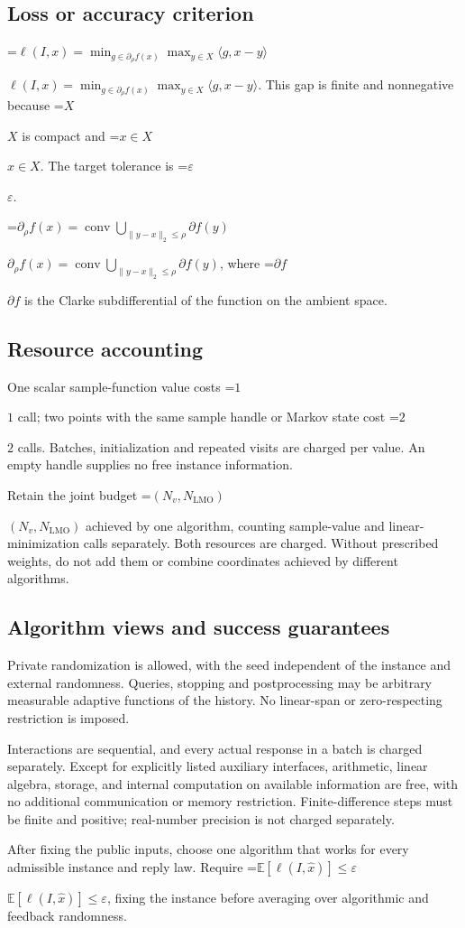 \documentclass[10pt,a4paper]{article}
\newcommand{\AtlasMath}[1]{\par\begingroup\centering\setbox0=\hbox{$\displaystyle #1$}\ifdim\wd0>1.4\linewidth\typeout{ATLAS WIDE FORMULA: \the\wd0}\fi\ifdim\wd0>\linewidth\resizebox{\linewidth}{!}{\box0}\else\box0\fi\par\endgroup}
\newcommand{\AtlasInlineMath}[1]{\begingroup\setbox0=\hbox{$#1$}\ifdim\wd0>.4\linewidth\endgroup\AtlasMath{#1}\else\endgroup$#1$\fi}
\begin{document}
\subsection{Loss or accuracy criterion}
\AtlasInlineMath{\ell(I,x)=\min_{g\in\partial_\rho f(x)}\max_{y\in X}\langle g,x-y\rangle}. This gap is finite and nonnegative because \AtlasInlineMath{X} is compact and \AtlasInlineMath{x\in X}. The target tolerance is \AtlasInlineMath{\varepsilon}.

\AtlasInlineMath{\partial_\rho f(x)=\operatorname{conv}\bigcup_{\|y-x\|_2\le\rho}\partial f(y)}, where \AtlasInlineMath{\partial f} is the Clarke subdifferential of the function on the ambient space.

\subsection{Resource accounting}
One scalar sample-function value costs \AtlasInlineMath{1} call; two points with the same sample handle or Markov state cost \AtlasInlineMath{2} calls. Batches, initialization and repeated visits are charged per value. An empty handle supplies no free instance information.

Retain the joint budget \AtlasInlineMath{(N_v,N_{\mathrm{LMO}})} achieved by one algorithm, counting sample-value and linear-minimization calls separately. Both resources are charged. Without prescribed weights, do not add them or combine coordinates achieved by different algorithms.

\subsection{Algorithm views and success guarantees}
Private randomization is allowed, with the seed independent of the instance and external randomness. Queries, stopping and postprocessing may be arbitrary measurable adaptive functions of the history. No linear-span or zero-respecting restriction is imposed.

Interactions are sequential, and every actual response in a batch is charged separately. Except for explicitly listed auxiliary interfaces, arithmetic, linear algebra, storage, and internal computation on available information are free, with no additional communication or memory restriction. Finite-difference steps must be finite and positive; real-number precision is not charged separately.

After fixing the public inputs, choose one algorithm that works for every admissible instance and reply law. Require \AtlasInlineMath{\mathbb{E}[\ell(I,\widehat{x})]\le \varepsilon}, fixing the instance before averaging over algorithmic and feedback randomness.
\end{document}
